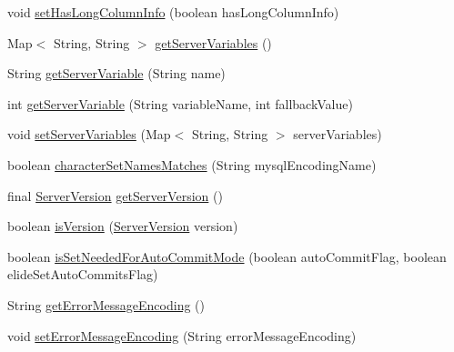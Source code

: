 \begin{DoxyCompactItemize}
\item 
void \mbox{\hyperlink{classcom_1_1mysql_1_1cj_1_1protocol_1_1a_1_1_native_server_session_ab7e6639fd06a4d47ab35e3cd89dfc10a}{set\+Has\+Long\+Column\+Info}} (boolean has\+Long\+Column\+Info)
\item 
Map$<$ String, String $>$ \mbox{\hyperlink{classcom_1_1mysql_1_1cj_1_1protocol_1_1a_1_1_native_server_session_a5d1f9481bc93bb7f3a7a1ab35298b626}{get\+Server\+Variables}} ()
\item 
String \mbox{\hyperlink{classcom_1_1mysql_1_1cj_1_1protocol_1_1a_1_1_native_server_session_ac4c00989ffc6de351aa574fb6cc4a24b}{get\+Server\+Variable}} (String name)
\item 
int \mbox{\hyperlink{classcom_1_1mysql_1_1cj_1_1protocol_1_1a_1_1_native_server_session_a1073d8d9d87cbae4427770f6a33825f5}{get\+Server\+Variable}} (String variable\+Name, int fallback\+Value)
\item 
void \mbox{\hyperlink{classcom_1_1mysql_1_1cj_1_1protocol_1_1a_1_1_native_server_session_a5075caf877a67ffac4ab458c54f56071}{set\+Server\+Variables}} (Map$<$ String, String $>$ server\+Variables)
\item 
boolean \mbox{\hyperlink{classcom_1_1mysql_1_1cj_1_1protocol_1_1a_1_1_native_server_session_a36b26698c0ac9c2f0935c2173e11297b}{character\+Set\+Names\+Matches}} (String mysql\+Encoding\+Name)
\item 
final \mbox{\hyperlink{classcom_1_1mysql_1_1cj_1_1_server_version}{Server\+Version}} \mbox{\hyperlink{classcom_1_1mysql_1_1cj_1_1protocol_1_1a_1_1_native_server_session_a38d2e0173e10f1f3b55a04c34c9fa8e8}{get\+Server\+Version}} ()
\item 
boolean \mbox{\hyperlink{classcom_1_1mysql_1_1cj_1_1protocol_1_1a_1_1_native_server_session_a07301eeaa6402981ce961f528b4e09ef}{is\+Version}} (\mbox{\hyperlink{classcom_1_1mysql_1_1cj_1_1_server_version}{Server\+Version}} version)
\item 
boolean \mbox{\hyperlink{classcom_1_1mysql_1_1cj_1_1protocol_1_1a_1_1_native_server_session_a4d7271374accd773d7db0f8858d479e7}{is\+Set\+Needed\+For\+Auto\+Commit\+Mode}} (boolean auto\+Commit\+Flag, boolean elide\+Set\+Auto\+Commits\+Flag)
\item 
String \mbox{\hyperlink{classcom_1_1mysql_1_1cj_1_1protocol_1_1a_1_1_native_server_session_aea6f38295ee9c65cfc59d975b20539ff}{get\+Error\+Message\+Encoding}} ()
\item 
void \mbox{\hyperlink{classcom_1_1mysql_1_1cj_1_1protocol_1_1a_1_1_native_server_session_a394485ebd068b7fa0c9a0c7343fcd53c}{set\+Error\+Message\+Encoding}} (String error\+Message\+Encoding)

\end{DoxyCompactItemize}
